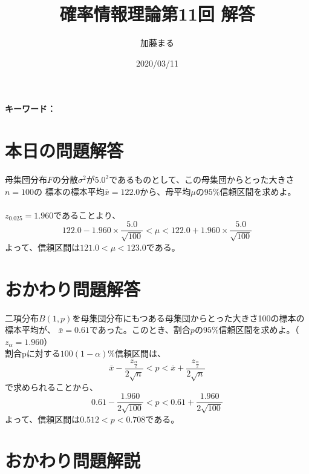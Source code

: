 \documentclass[a4j,uplatex,dvipdfmx]{jsarticle}
\title{確率情報理論第11回 解答}
\author{加藤まる}
\date{2020/03/11}
\begin{document}
\maketitle
\bf キーワード：
\rm

\section*{本日の問題解答}
母集団分布$F$の分散$\sigma ^2$が$5.0^2$であるものとして、この母集団からとった大きさ$n=100$の
標本の標本平均$\bar{x}=122.0$から、母平均$\mu$の$95\%$信頼区間を求めよ。
\\ \\ 
$z_{0.025}=1.960$であることより、
\begin{equation}
  122.0-1.960\times \frac{5.0}{\sqrt{100}} < \mu < 122.0+1.960\times \frac{5.0}{\sqrt{100}}
\end{equation}
よって、信頼区間は$121.0<\mu < 123.0$である。


\section*{おかわり問題解答}
二項分布$B(1,p)$を母集団分布にもつある母集団からとった大きさ100の標本の標本平均が、
$\bar{x}=0.61$であった。このとき、割合$p$の$95 \%$信頼区間を求めよ。（$z_α =1.960$）\\
割合pに対する$100(1-α)\%$信頼区間は、
\begin{equation}
  \bar{x}-\frac{z_{\frac{α}{2}}}{2\sqrt{n}} < p < \bar{x}+\frac{z_{\frac{α}{2}}}{2\sqrt{n}}
\end{equation}
で求められることから、
\begin{equation}
  0.61 - \frac{1.960}{2\sqrt{100}} < p < 0.61 + \frac{1.960}{2\sqrt{100}}
\end{equation}
よって、信頼区間は$0.512<p<0.708$である。


\section*{おかわり問題解説}
\end{document}
